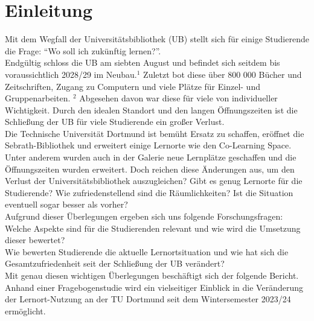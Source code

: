 \documentclass[11pt, a4paper]{article}
\begin{document}
\section{Einleitung}
\label{Einleitung}
Mit dem Wegfall der Universitätsbibliothek (UB) stellt sich für einige Studierende die Frage: “Wo soll ich zukünftig lernen?”.\\
Endgültig schloss die UB am siebten August und befindet sich seitdem bis voraussichtlich 2028/29 im Neubau.\hyperref[seitenverweis]{$^1$} Zuletzt bot diese über 800 000 Bücher und Zeitschriften, Zugang zu Computern und viele Plätze für Einzel- und Gruppenarbeiten. \hyperref[seitenverweis]{$^2$} Abgesehen davon war diese für viele von individueller Wichtigkeit.
Durch den idealen Standort und den langen Öffnungszeiten ist die Schließung der UB für viele Studierende ein großer Verlust.\\
Die Technische Universität Dortmund ist bemüht Ersatz zu schaffen, eröffnet die Sebrath-Bibliothek und erweitert einige Lernorte wie den Co-Learning Space.
Unter anderem wurden auch in der Galerie neue Lernplätze geschaffen und die Öffnungszeiten wurden erweitert.
Doch reichen diese Änderungen aus, um den Verlust der Universitätsbibliothek auszugleichen?
Gibt es genug Lernorte für die Studierende? Wie zufriedenstellend sind die Räumlichkeiten? Ist die Situation eventuell sogar besser als vorher?\\

\vspace{-0.2cm}
Aufgrund dieser Überlegungen ergeben sich uns folgende Forschungsfragen:\\
Welche Aspekte sind für die Studierenden relevant und wie wird die Umsetzung dieser bewertet?\\
Wie bewerten Studierende die aktuelle Lernortsituation und wie hat sich die Gesamtzufriedenheit seit der Schließung der UB verändert?\\
Mit genau diesen wichtigen Überlegungen beschäftigt sich der folgende Bericht.
Anhand einer Fragebogenstudie wird ein vielseitiger Einblick in die Veränderung der Lernort-Nutzung an der TU Dortmund seit dem Wintersemester 2023/24 ermöglicht.
\end{document}
